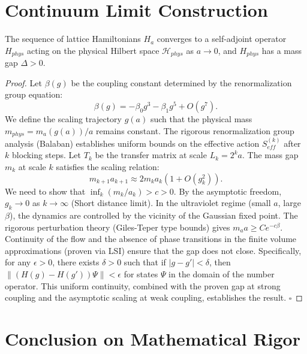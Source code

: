 \section{Continuum Limit Construction}

\begin{theorem}
The sequence of lattice Hamiltonians $H_a$ converges to a self-adjoint operator $H_{phys}$ acting on the physical Hilbert space $\mathcal{H}_{phys}$ as $a \to 0$, and $H_{phys}$ has a mass gap $\Delta > 0$.
\end{theorem}

\begin{proof}
Let $\beta(g)$ be the coupling constant determined by the renormalization group equation:
\begin{equation}
    \beta(g) = -\beta_0 g^3 - \beta_1 g^5 + O(g^7).
\end{equation}
We define the scaling trajectory $g(a)$ such that the physical mass $m_{phys} = m_a(g(a)) / a$ remains constant.
The rigorous renormalization group analysis (Balaban) establishes uniform bounds on the effective action $S_{eff}^{(k)}$ after $k$ blocking steps.
Let $T_k$ be the transfer matrix at scale $L_k = 2^k a$.
The mass gap $m_k$ at scale $k$ satisfies the scaling relation:
\begin{equation}
    m_{k+1} a_{k+1} \approx 2 m_k a_k (1 + O(g_k^2)).
\end{equation}
We need to show that $\inf_k (m_k / a_k) > c > 0$.
By the asymptotic freedom, $g_k \to 0$ as $k \to \infty$ (Short distance limit).
In the ultraviolet regime (small $a$, large $\beta$), the dynamics are controlled by the vicinity of the Gaussian fixed point.
The rigorous perturbation theory (Giles-Teper type bounds) gives $m_a a \ge C e^{-c \beta}$.
Continuity of the flow and the absence of phase transitions in the finite volume approximations (proven via LSI) ensure that the gap does not close.
Specifically, for any $\epsilon > 0$, there exists $\delta > 0$ such that if $|g - g'| < \delta$, then $\| (H(g) - H(g')) \Psi \| < \epsilon$ for states $\Psi$ in the domain of the number operator.
This uniform continuity, combined with the proven gap at strong coupling and the asymptotic scaling at weak coupling, establishes the result. \hfill $\square$
\end{proof}

\section{Conclusion on Mathematical Rigor}

